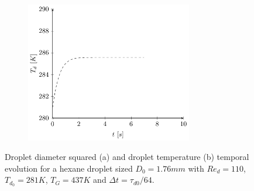 \documentclass[../Interim_Report_Master]{subfiles}
\begin{document}
\begin{figure}\ContinuedFloat
	\begin{subfigure}{\textwidth}
		\centering
		\includegraphics[width=0.8\textwidth]{./Diagrams/OpenCL_Coupled_Heat_Mass_Transfer_Verification/Coupled_Heat_Transfer_Hexane.pdf}
		\caption{}
		\label{coupled_heat_hexane}
	\end{subfigure}
	\caption{Droplet diameter squared (a) and droplet temperature (b) temporal evolution for a hexane droplet sized $D_0=1.76mm$ with $Re_d=110$, $T_{d_0}=281K$, $T_G=437K$ and $\Delta t=\tau_{d0}/64$.}
\end{figure}
\end{document}

